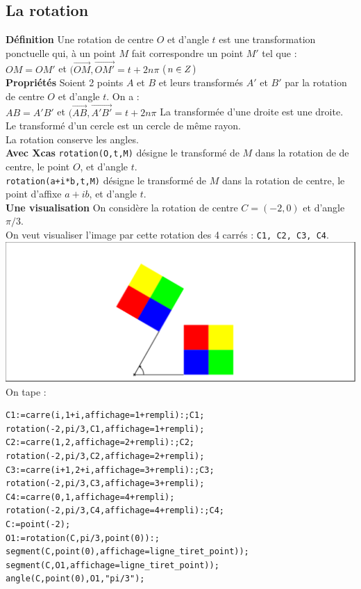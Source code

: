 \documentclass[a4paper,11pt]{book}
\newcommand{\Z}{{\mathbb{Z}}}
\begin{document}
\subsection{La rotation}
{\bf D\'efinition}
Une rotation de centre $O$ et d'angle $t$ est une transformation 
ponctuelle qui, \`a un point $M$ fait correspondre un point $M'$ tel que :\\
$OM=OM'$ et $(\overrightarrow{OM},\overrightarrow{OM'}=t+2n\pi$ ($n\in \\Z$)\\
{\bf Propri\'et\'es}
Soient 2 points $A$ et $B$ et leurs transform\'es $A'$ et $B'$ par la 
rotation de centre $O$ et d'angle $t$. On a :\\
$AB=A'B'$ et $(\overrightarrow{AB},\overrightarrow{A'B'}=t+2n\pi$
La transform\'ee d'une droite est une droite.\\
Le transform\'e d'un cercle est un cercle de m\^eme rayon.\\
La rotation conserve les angles.\\
{\bf Avec Xcas}
{\tt rotation(O,t,M)} d\'esigne le transform\'e de $M$ dans la rotation de 
de centre, le point $O$, et d'angle $t$.\\
{\tt rotation(a+i*b,t,M)} d\'esigne le transform\'e de $M$ dans la rotation 
de centre, le point d'affixe $a+ib$, et d'angle $t$.\\
{\bf Une visualisation}
On consid\`ere la rotation de centre $C=(-2,0)$ et d'angle $\pi/3$.\\
On veut visualiser l'image par cette rotation des 4 carr\'es :
{\tt C1, C2, C3, C4}.\\
\includegraphics[width=\textwidth]{damierrot1}\\
On tape :
\begin{verbatim}
C1:=carre(i,1+i,affichage=1+rempli):;C1;
rotation(-2,pi/3,C1,affichage=1+rempli);
C2:=carre(1,2,affichage=2+rempli):;C2;
rotation(-2,pi/3,C2,affichage=2+rempli);
C3:=carre(i+1,2+i,affichage=3+rempli):;C3;
rotation(-2,pi/3,C3,affichage=3+rempli);
C4:=carre(0,1,affichage=4+rempli);
rotation(-2,pi/3,C4,affichage=4+rempli):;C4;
C:=point(-2);
O1:=rotation(C,pi/3,point(0)):;
segment(C,point(0),affichage=ligne_tiret_point));
segment(C,O1,affichage=ligne_tiret_point));
angle(C,point(0),O1,"pi/3");
\end{verbatim}
\end{document}
